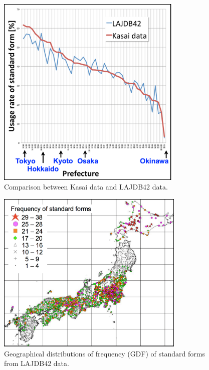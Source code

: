 \documentclass[output=paper]{LSP/langsci}
\begin{document}
\begin{figure}
\includegraphics[width=0.8\textwidth]{illustrations/kuma_fig05}
\caption{Comparison between Kasai data and LAJDB42 data.}    
\label{fig:5}
\end{figure} 
\begin{figure}
\includegraphics[width=0.8\textwidth]{illustrations/kuma_fig06}
\caption{Geographical distributions of frequency (GDF) of standard forms from LAJDB42 data.}          
\label{fig:6}
\end{figure} 
\end{document}
